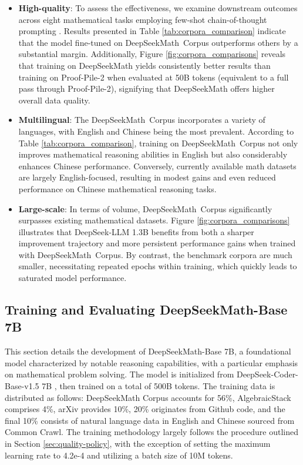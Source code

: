 \begin{itemize}[topsep=0pt]
    \item \textbf{High-quality}:
    To assess the effectiveness, we examine downstream outcomes across eight mathematical tasks employing few-shot chain-of-thought prompting \cite{cot}. Results presented in Table \ref{tab:corpora_comparison} indicate that the model fine-tuned on DeepSeekMath~Corpus outperforms others by a substantial margin. Additionally, Figure \ref{fig:corpora_comparisons} reveals that training on DeepSeekMath yields consistently better results than training on Proof-Pile-2 when evaluated at 50B tokens (equivalent to a full pass through Proof-Pile-2), signifying that DeepSeekMath offers higher overall data quality.
    \item \textbf{Multilingual}:
    The DeepSeekMath~Corpus incorporates a variety of languages, with English and Chinese being the most prevalent. According to Table \ref{tab:corpora_comparison}, training on DeepSeekMath~Corpus not only improves mathematical reasoning abilities in English but also considerably enhances Chinese performance. Conversely, currently available math datasets are largely English-focused, resulting in modest gains and even reduced performance on Chinese mathematical reasoning tasks.
    \item \textbf{Large-scale}:
    In terms of volume, DeepSeekMath~Corpus significantly surpasses existing mathematical datasets. Figure \ref{fig:corpora_comparisons} illustrates that DeepSeek-LLM 1.3B benefits from both a sharper improvement trajectory and more persistent performance gains when trained with DeepSeekMath~Corpus. By contrast, the benchmark corpora are much smaller, necessitating repeated epochs within training, which quickly leads to saturated model performance.
\end{itemize}

\subsection{Training and Evaluating DeepSeekMath-Base 7B}

This section details the development of DeepSeekMath-Base 7B, a foundational model characterized by notable reasoning capabilities, with a particular emphasis on mathematical problem solving. The model is initialized from DeepSeek-Coder-Base-v1.5 7B \citep{deepseek-coder}, then trained on a total of 500B tokens. The training data is distributed as follows: DeepSeekMath Corpus accounts for 56\%, AlgebraicStack comprises 4\%, arXiv provides 10\%, 20\% originates from Github code, and the final 10\% consists of natural language data in English and Chinese sourced from Common Crawl. The training methodology largely follows the procedure outlined in Section \ref{sec:quality-policy}, with the exception of setting the maximum learning rate to 4.2e-4 and utilizing a batch size of 10M tokens.

